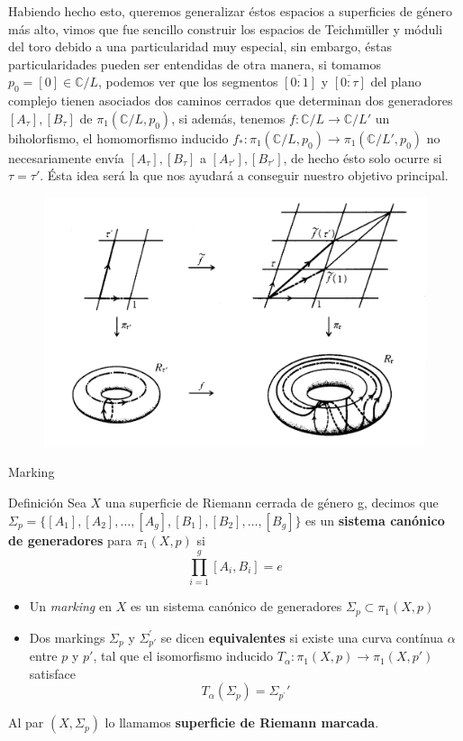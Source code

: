 \documentclass[xcolor=dvipsnames,10pt]{beamer}
\newcommand\C{\ensuremath{\mathbb{C}}}
\begin{document}
\begin{frame}
    Habiendo hecho esto, queremos generalizar éstos espacios a superficies de género más alto, vimos que fue sencillo construir los espacios de Teichmüller y móduli del toro debido a una particularidad muy especial, sin embargo, éstas particularidades pueden ser entendidas de otra manera, si tomamos $p_0 = [0] \in \C /L$, podemos ver que los segmentos $\overline{[0:1]}$ y $\overline{[0:\tau]}$ del plano complejo tienen asociados dos caminos cerrados que determinan dos generadores $[A_\tau],[B_\tau]$ de $\pi_1(\C /L,p_0)$, si además, tenemos $f: \C/L \rightarrow \C/L'$ un biholorfismo, el homomorfismo inducido $f_*: \pi_1(\C/L,p_0) \rightarrow \pi_1(\C/L', p_0)$ no necesariamente envía $[A_\tau],[B_\tau]$ a $[A_{\tau'}],[B_{\tau'}]$, de hecho ésto solo ocurre si $\tau = \tau'$. Ésta idea será la que nos ayudará a conseguir nuestro objetivo principal.
    \begin{figure}
            \centering
            \includegraphics[width=0.5\linewidth]{Imagenes/Marking.png}
        \end{figure}  
\end{frame}
\begin{frame}{Marking}
    \begin{block}{Definición}
        Sea $X$ una superficie de Riemann cerrada de género g,  decimos que $\Sigma_p = \{[A_1],[A_2],\ldots,[A_g],[B_1],[B_2],\ldots, [B_g]\}$ es un \textbf{sistema canónico de generadores} para $\pi_1(X,p)$ si
    \[ \prod_{i=1}^g [A_i,B_i] = e \]
    \begin{itemize}
        \item Un \textit{marking} en $X$ es un sistema canónico de generadores $\Sigma_p \subset \pi_1(X,p)$
        \item Dos markings $\Sigma_p$ y $\Sigma_{p'}^\prime$ se dicen  \textbf{equivalentes} si existe una curva contínua $\alpha$ entre $p$ y $p'$, tal que el isomorfismo inducido $T_\alpha: \pi_1(X,p) \rightarrow \pi_1(X,p')$ satisface
        \[
        T_\alpha(\Sigma_p) = \Sigma_{p^\prime}'
        \]
    \end{itemize}
    Al par $(X,\Sigma_p)$ lo llamamos \textbf{superficie de Riemann marcada}. 
    \end{block}
    \end{frame}
\end{document}
